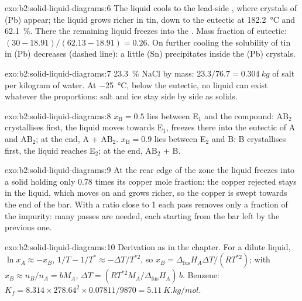\begin{solution}{exo:b2:solid-liquid-diagrams:6}
The liquid cools to the lead-side , where crystals of (Pb) appear; the
liquid grows richer in tin, down to the eutectic at \qty{182.2}{\degreeCelsius}
and 62.1~\%. There the remaining liquid freezes into the .
Mass fraction of eutectic: $(30 - 18.91)/(62.13 - 18.91) = 0.26$. On further
cooling the solubility of tin in (Pb) decreases (dashed line): a little (Sn)
precipitates inside the (Pb) crystals.
\end{solution}

\begin{solution}{exo:b2:solid-liquid-diagrams:7}
23.3~\% NaCl by mass: $23.3/76.7 = \qty{0.304}{kg}$ of salt per kilogram of
water. At \qty{-25}{\degreeCelsius}, below the eutectic, no liquid can exist
whatever the proportions: salt and ice stay side by side as solids.
\end{solution}

\begin{solution}{exo:b2:solid-liquid-diagrams:8}
$x_{\mathrm B} = 0.5$ lies between E$_1$ and the compound: $\mathrm{AB_2}$
crystallises first, the liquid moves towards E$_1$, freezes there into the
eutectic of A and $\mathrm{AB_2}$; at the end, A + $\mathrm{AB_2}$.
$x_{\mathrm B} = 0.9$ lies between E$_2$ and B: B crystallises first, the liquid
reaches E$_2$; at the end, $\mathrm{AB_2}$ + B.
\end{solution}

\begin{solution}{exo:b2:solid-liquid-diagrams:9}
At the rear edge of the zone the liquid freezes into a solid holding only 0.78
times its copper mole fraction: the copper rejected stays in the liquid, which
moves on and grows richer, so the copper is swept towards the end of the bar.
With a ratio close to 1 each pass removes only a fraction of the impurity:
many passes are needed, each starting from the bar left by the previous one.
\end{solution}

\begin{solution}{exo:b2:solid-liquid-diagrams:10}
Derivation as in the chapter. For a dilute liquid, $\ln x_A \approx -x_B$, $1/T -
1/T^* \approx -\Delta T/T^{*2}$, so $x_B = \Delta_{\text{fus}}H_A\Delta T/(RT^{*2})$;
with $x_B \approx n_B/n_A = bM_A$, $\Delta T = (RT^{*2}M_A/\Delta_{\text{fus}}H_A)\,b$.
Benzene: $K_f = 8.314 \times 278.64^2 \times 0.07811/9870 = \qty{5.11}{K.kg/mol}$.
\end{solution}

